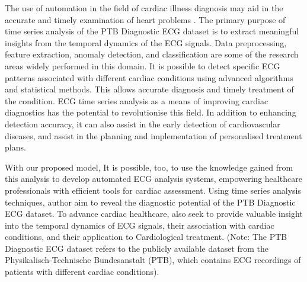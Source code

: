 \par The use of automation in the field of cardiac illness diagnosis may aid in the accurate and timely examination of heart problems \cite{rahul2020exploratory}. The primary purpose of time series analysis of the PTB Diagnostic ECG dataset is to extract meaningful insights from the temporal dynamics of the ECG signals. Data preprocessing,  feature extraction,  anomaly detection,  and classification are some of the research areas widely performed in this domain. It is possible to detect specific ECG patterns associated with different cardiac conditions using advanced algorithms and statistical methods. This allows accurate diagnosis and timely treatment of the condition. ECG time series analysis as a means of improving cardiac diagnostics has the potential to revolutionise this field. In addition to enhancing detection accuracy,  it can also assist in the early detection of cardiovascular diseases,  and assist in the planning and implementation of personalised treatment plans. \par With our proposed model, It is possible,  too,  to use the knowledge gained from this analysis to develop automated ECG analysis systems,  empowering healthcare professionals with efficient tools for cardiac assessment. Using time series analysis techniques,  author aim to reveal the diagnostic potential of the PTB Diagnostic ECG dataset. To advance cardiac healthcare,  also seek to provide valuable insight into the temporal dynamics of ECG signals,  their association with cardiac conditions,  and their application to Cardiological treatment. (Note: The PTB Diagnostic ECG dataset refers to the publicly available dataset from the Physikalisch-Technische Bundesanstalt (PTB),  which contains ECG recordings of patients with different cardiac conditions).
